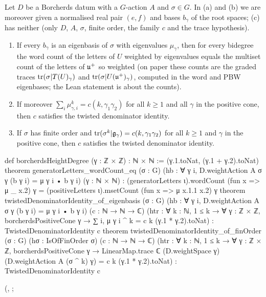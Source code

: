 \begin{theorem}\label{ch19:thm:twistedabstract}
Let $D$ be a Borcherds datum with a $G$-action $A$ and $\sigma\in G$.  In (a) and (b) we are moreover given a normalised real pair
$(e,f)$ and bases $b_\gamma$ of the root spaces; (c) has neither (only $D$, $A$, $\sigma$, finite order, the family $c$ and the trace
hypothesis).
\begin{enumerate}[label=(\alph*)]
\item If every $b_\gamma$ is an eigenbasis of $\sigma$ with eigenvalues $\mu_\gamma$, then for every bidegree the word count of
  the letters of $U$ weighted by eigenvalues equals the multiset count of the letters of $\mathfrak{u}^+$ so weighted (on paper these counts are the graded traces
  $\operatorname{tr}(\sigma|T(U)_\gamma)$ and $\operatorname{tr}(\sigma|U(\mathfrak{u}^+)_\gamma)$, computed in the word and PBW eigenbases; the Lean statement is about the
  counts).
\item If moreover $\sum_i\mu_{\gamma,i}^k=c(k,\gamma_1\gamma_2)$ for all $k\ge1$ and all $\gamma$ in the positive cone, then $c$
  satisfies the twisted denominator identity.
\item If $\sigma$ has finite order and $\operatorname{tr}(\sigma^k|\mathfrak g_\gamma)=c(k,\gamma_1\gamma_2)$ for all $k\ge1$ and $\gamma$ in the positive
  cone, then $c$ satisfies the twisted denominator identity.
\end{enumerate}
\end{theorem}
\begin{leancode}
def borcherdsHeightDegree (γ : ℤ × ℤ) : ℕ × ℕ := (γ.1.toNat, (γ.1 + γ.2).toNat)
theorem generatorLetters_wordCount_eq (σ : G)
    (hb : ∀ γ i, D.weightAction A σ γ (b γ i) = μ γ i • b γ i) (γ : ℕ × ℕ) :
    (generatorLetters ι).wordCount (fun x => μ _ x.2) γ =
      (positiveLetters ι).msetCount (fun x => μ x.1.1 x.2) γ
theorem twistedDenominatorIdentity_of_eigenbasis (σ : G)
    (hb : ∀ γ i, D.weightAction A σ γ (b γ i) = μ γ i • b γ i) (c : ℕ → ℕ → ℂ)
    (htr : ∀ k : ℕ, 1 ≤ k → ∀ γ : ℤ × ℤ, borcherdsPositiveCone γ →
      ∑ i, μ γ i ^ k = c k (γ.1 * γ.2).toNat) :
    TwistedDenominatorIdentity c
theorem twistedDenominatorIdentity_of_finOrder (σ : G) (hσ : IsOfFinOrder σ) (c : ℕ → ℕ → ℂ)
    (htr : ∀ k : ℕ, 1 ≤ k → ∀ γ : ℤ × ℤ, borcherdsPositiveCone γ →
      LinearMap.trace ℂ (D.weightSpace γ) (D.weightAction A (σ ^ k) γ) =
        c k (γ.1 * γ.2).toNat) :
    TwistedDenominatorIdentity c
\end{leancode}
(, ;
